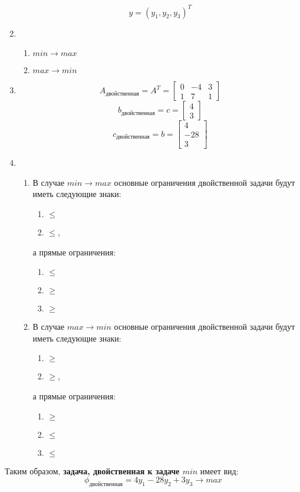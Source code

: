 \documentclass[11pt]{article}
\begin{document}
\begin{enumerate}
	$$y = (y_1, y_2, y_3)^T$$
	\item \begin{enumerate}
		\item $min \rightarrow{} max$
		\item $max \rightarrow{} min$
	\end{enumerate}
	\item $$A_{\text{двойственная}} = A^T = 
	\begin{bmatrix}
	0 & -4 & 3\\
	1 & 7 & 1
	\end{bmatrix}$$
	$$b_{\text{двойственная}} = c =\begin{bmatrix}
	4\\
	3
	\end{bmatrix}$$
	$$c_{\text{двойственная}} = b =\begin{bmatrix}
	4\\
	-28\\
	3
	\end{bmatrix}$$
	\item  \begin{enumerate}
		\item В случае  $min \rightarrow{} max$ 
		основные ограничения двойственной задачи будут иметь следующие знаки:
		\begin{enumerate}
			\item $\leq$ 
			\item $\leq$,
		\end{enumerate}
		а прямые ограничения:
		\begin{enumerate}
			\item $\leq$
			\item $\geq$
			\item $\geq$
		\end{enumerate}
		\item В случае   $max \rightarrow{} min$ 
		основные ограничения двойственной задачи будут иметь следующие знаки:
		\begin{enumerate}
			\item $\geq$ 
			\item $\geq$,
		\end{enumerate}
		а прямые ограничения:
		\begin{enumerate}
			\item $\geq$
			\item $\leq$
			\item $\leq$
		\end{enumerate}
	\end{enumerate}
\end{enumerate}
Таким образом, \textbf{задача, двойственная к задаче $min$}  имеет вид:
$$\phi_{\text{двойственная}} = 4y_1 -28y_2 + 3y_3 \rightarrow{} max$$
\end{document}
